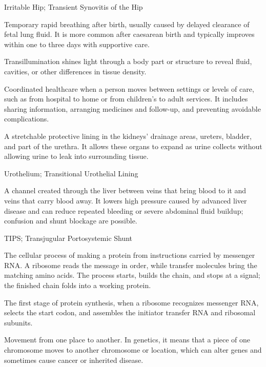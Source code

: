 \synonyms
Irritable Hip; Transient Synovitis of the Hip

 Temporary rapid breathing after birth, usually caused by delayed clearance of fetal lung fluid. It is more common after caesarean birth and typically improves within one to three days with supportive care.

 Transillumination shines light through a body part or structure to reveal fluid, cavities, or other differences in tissue density.

 Coordinated healthcare when a person moves between settings or levels of care, such as from hospital to home or from children’s to adult services. It includes sharing information, arranging medicines and follow-up, and preventing avoidable complications.

 A stretchable protective lining in the kidneys’ drainage areas, ureters, bladder, and part of the urethra. It allows these organs to expand as urine collects without allowing urine to leak into surrounding tissue.

\synonyms
Urothelium; Transitional Urothelial Lining

 A channel created through the liver between veins that bring blood to it and veins that carry blood away. It lowers high pressure caused by advanced liver disease and can reduce repeated bleeding or severe abdominal fluid buildup; confusion and shunt blockage are possible.

\synonyms
TIPS; Transjugular Portosystemic Shunt

 The cellular process of making a protein from instructions carried by messenger RNA. A ribosome reads the message in order, while transfer molecules bring the matching amino acids. The process starts, builds the chain, and stops at a signal; the finished chain folds into a working protein.

 The first stage of protein synthesis, when a ribosome recognizes messenger RNA, selects the start codon, and assembles the initiator transfer RNA and ribosomal subunits.

 Movement from one place to another. In genetics, it means that a piece of one chromosome moves to another chromosome or location, which can alter genes and sometimes cause cancer or inherited disease.

